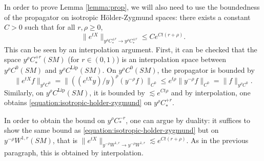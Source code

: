 \documentclass[10pt]{amsart}
\theoremstyle{plain}
\theoremstyle{definition}
\begin{document}
{\color{black}In order to prove Lemma \ref{lemma:prop}, we will also need to use the boundedness of the propagator on isotropic Hölder-Zygmund spaces: there exists a constant $C > 0$ such that for all $r, \rho \geq 0$,
\begin{equation}
\label{equation:isotropic-holder-zygmund}
\|e^{tX}\|_{y^\rho C^{\pm r}_* \to y^\rho C^{\pm r}_*} \leq C e^{Ct(r+\rho)}.
\end{equation}
This can be seen by an interpolation argument. First, it can be checked that the space $y^\rho C^{+r}_*(SM)$ (for $r \in (0,1)$) is an interpolation space between $y^\rho C^0(SM)$ and $y^\rho C^{\mathrm{Lip}}(SM)$. On $y^\rho C^0(SM)$, the propagator is bounded by
\[
\|e^{tX} f\|_{y^\rho C^0} = \|((e^{tX}y)/y)^\rho (y^{-\rho} f)\|_{C^0} \leq e^{t \rho} \|y^{-\rho} f\|_{C^0} = \|f\|_{y^\rho C^0}.
\]
Similarly, on $y^\rho C^{\mathrm{Lip}}(SM)$, it is bounded by $\lesssim e^{Ct \rho}$ and by interpolation, one obtains \eqref{equation:isotropic-holder-zygmund} on $y^\rho C^{+ r}_*$.

In order to obtain the bound on $y^\rho C^{- r}_*$, one can argue by duality: it suffices to show the same bound as \eqref{equation:isotropic-holder-zygmund} but on $y^{-\rho} W^{1,r}(SM)$, that is $\|e^{tX}\|_{y^{-\rho}W^{1,r} \to y^{-\rho}W^{1,r}} \lesssim e^{Ct(r+\rho)}$. As in the previous paragraph, this is obtained by interpolation.}
\end{document}
